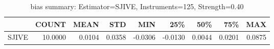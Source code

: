 \begin{table}[ht]
\centering
\caption{bias summary: Estimator=SJIVE, Instruments=125, Strength=0.40}
\begin{tabular}{lrrrrrrrr}
\toprule
 & COUNT & MEAN & STD & MIN & 25\% & 50\% & 75\% & MAX \\
\midrule
SJIVE & 10.0000 & 0.0104 & 0.0358 & -0.0306 & -0.0130 & 0.0044 & 0.0201 & 0.0875 \\
\bottomrule
\end{tabular}
\end{table}
